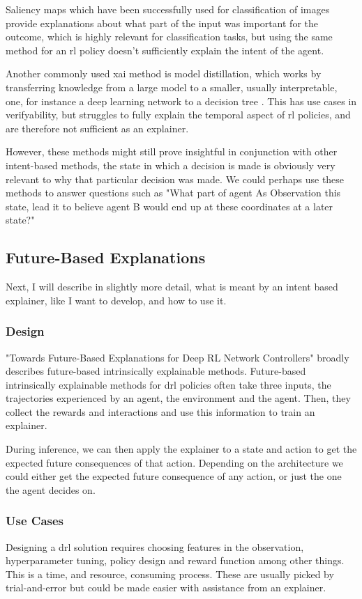 \documentclass[UKenglish]{uiomasterthesis}
\begin{document}
Saliency maps which have been successfully used for classification of images provide explanations about what part of the input was important for the outcome, which is highly relevant for classification tasks, but using the same method for an \ac{rl} policy doesn't sufficiently explain the intent of the agent\cite{atrey2020exploratory}.

Another commonly used \ac{xai} method is model distillation, which works by transferring knowledge from a large model to a smaller, usually interpretable, one, for instance a deep learning network to a decision tree \cite{bastani2019verifiable}. This has use cases in verifyability, but struggles to fully explain the temporal aspect of \ac{rl} policies, and are therefore not sufficient as an explainer.

However, these methods might still prove insightful in conjunction with other intent-based methods, the state in which a decision is made is obviously very relevant to why that particular decision was made. We could perhaps use these methods to answer questions such as "What part of agent As Observation this state, lead it to believe agent B would end up at these coordinates at a later state?"


\subsection{Future-Based Explanations}
Next, I will describe in slightly more detail, what is meant by an intent based explainer, like I want to develop, and how to use it.

\subsubsection{Design}
"Towards Future-Based Explanations for Deep RL Network Controllers"\cite{10.1145/3626570.3626607} broadly describes future-based intrinsically explainable methods. Future-based intrinsically explainable methods for \ac{drl} policies often take three inputs, the trajectories experienced by an agent, the environment and the agent. Then, they collect the rewards and interactions and use this information to train an explainer.

During inference, we can then apply the explainer to a state and action to get the expected future consequences of that action. Depending on the architecture we could either get the expected future consequence of any action, or just the one the agent decides on.

\subsubsection{Use Cases}
Designing a \ac{drl} solution requires choosing features in the observation, hyperparameter tuning, policy design and reward function among other things. This is a time, and resource, consuming process. These are usually picked by trial-and-error but could be made easier with assistance from an explainer.
\end{document}
